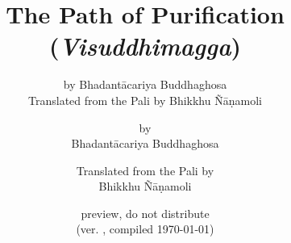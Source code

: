 


	\title{The Path of Purification \\ (\emph{Visuddhimagga})}
	\date{preview, do not distribute \\ (ver. \vismCommitHref, compiled \today)}
	\ifplastex
		\author{by Bhadantācariya Buddhaghosa \\ Translated from the Pali by Bhikkhu Ñāṇamoli}
	\else
		\author{by \\ Bhadantācariya Buddhaghosa \and Translated from the Pali by \\ Bhikkhu Ñāṇamoli}
	\fi
	\maketitle

	\frontmatter
		\bgroup
			\ifplastex\else\renewcommand{\baselinestretch}{0.2}\normalsize\fi
			\tableofcontents
		\egroup
		
	\backmatter
		
		

